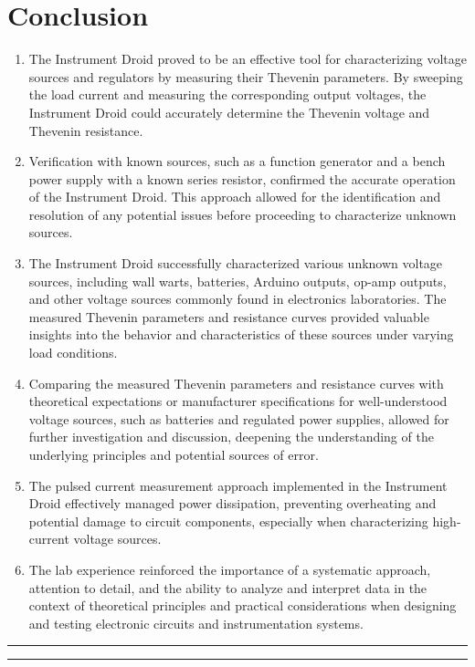 \documentclass[a4paper,11pt]{article}%
\begin{document}
\section{Conclusion}

\begin{enumerate}
  \item The Instrument Droid proved to be an effective tool for characterizing voltage sources and regulators by measuring their Thevenin parameters. By sweeping the load current and measuring the corresponding output voltages, the Instrument Droid could accurately determine the Thevenin voltage and Thevenin resistance.
  \item Verification with known sources, such as a function generator and a bench power supply with a known series resistor, confirmed the accurate operation of the Instrument Droid. This approach allowed for the identification and resolution of any potential issues before proceeding to characterize unknown sources.
  \item The Instrument Droid successfully characterized various unknown voltage sources, including wall warts, batteries, Arduino outputs, op-amp outputs, and other voltage sources commonly found in electronics laboratories. The measured Thevenin parameters and resistance curves provided valuable insights into the behavior and characteristics of these sources under varying load conditions.
  \item Comparing the measured Thevenin parameters and resistance curves with theoretical expectations or manufacturer specifications for well-understood voltage sources, such as batteries and regulated power supplies, allowed for further investigation and discussion, deepening the understanding of the underlying principles and potential sources of error.
  \item The pulsed current measurement approach implemented in the Instrument Droid effectively managed power dissipation, preventing overheating and potential damage to circuit components, especially when characterizing high-current voltage sources.
  \item The lab experience reinforced the importance of a systematic approach, attention to detail, and the ability to analyze and interpret data in the context of theoretical principles and practical considerations when designing and testing electronic circuits and instrumentation systems.
\end{enumerate}







\vspace{50px}
\hrule
\hrule

\pagebreak





\end{document}
